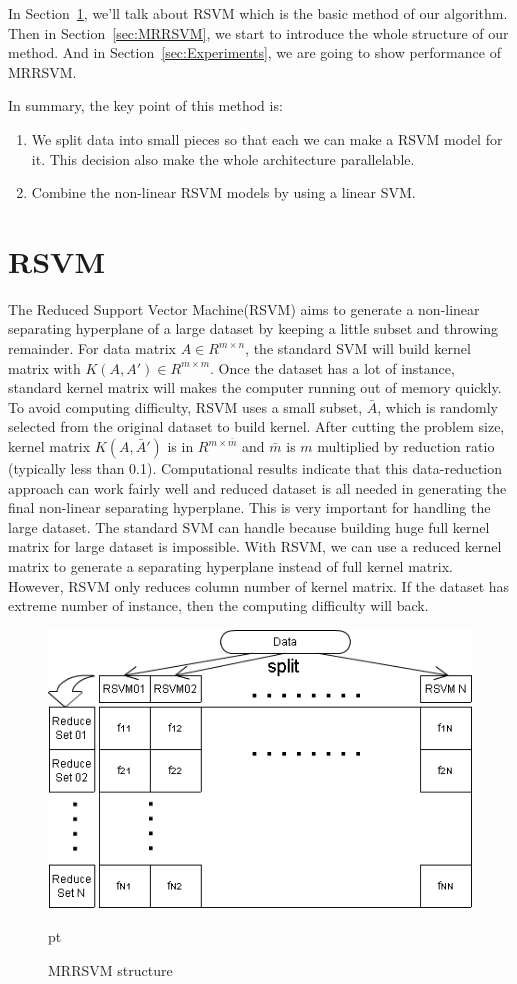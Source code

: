 \documentclass[conference]{IEEEtran}
\begin{document}
In Section~\ref{sec:RSVM}, we'll talk about RSVM which is the basic method of our algorithm. Then in Section~\ref{sec:MRRSVM}, we start to introduce the whole structure of our method. And in Section~\ref{sec:Experiments}, we are going to show performance of MRRSVM.

In summary, the key point of this method is:
\begin{enumerate}
  \item We split data into small pieces so that each we can make a RSVM model for it. This decision also make the whole architecture parallelable.
  \item Combine the non-linear RSVM models by using a linear SVM.
\end{enumerate}

\section{RSVM}
\label{sec:RSVM}
The Reduced Support Vector Machine(RSVM) aims to generate a non-linear separating hyperplane of a large dataset by keeping a little subset and throwing remainder. For data matrix $A \in R^{m\times n}$, the standard SVM will build kernel matrix with $K(A, A') \in R^{m\times m}$. Once the dataset has a lot of instance, standard kernel matrix will makes the computer running out of memory quickly. To avoid computing difficulty, RSVM uses a small subset, $\bar{A}$, which is randomly selected from the original dataset to build kernel. After cutting the problem size, kernel matrix $K(A, \bar{A}')$ is in $R^{m\times \bar{m}}$ and $\bar{m}$ is $m$ multiplied by reduction ratio (typically less than 0.1). Computational results indicate that this data-reduction approach can work fairly well and reduced dataset is all needed in generating the final non-linear separating hyperplane. This is very important for handling the large dataset. The standard SVM can handle because building huge full kernel matrix for large dataset is impossible. With RSVM, we can use a reduced kernel matrix to generate a separating hyperplane instead of full kernel matrix. However, RSVM only reduces column number of kernel matrix. If the dataset has extreme number of instance, then the computing difficulty will back.

\begin{figure}[t]
	\centering
	\includegraphics[width=0.6\linewidth]{structure.png}
	\caption{MRRSVM structure}
	 pt
	\label{fig:structure}
\end{figure}
\end{document}
